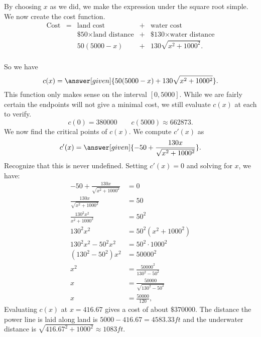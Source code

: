 \documentclass{ximera}
\begin{document}
\begin{example}
\begin{explanation}
\begin{image}
      \end{image}
      By choosing $x$ as we did, we make the expression under the
      square root simple. We now create the cost function.
    \[
    \begin{array}{ccccc}
      \text{Cost} &=&  \text{land cost} &+ & \text{water cost} \\
						&	& \text{\$50}\times \text{land distance} &+& \text{\$130}\times \text{water distance} \\
      &	& 50(5000-x) &+& 130\sqrt{x^2+1000^2}.\\
    \end{array}
    \]

    So we have
    \[
    c(x) = \answer[given]{50(5000-x)+ 130\sqrt{x^2+1000^2}}.
    \]
    This function only makes sense on the interval $[0,5000]$. While
    we are fairly certain the endpoints will not give a minimal cost,
    we still evaluate $c(x)$ at each to verify.
    \[
    c(0) = 380000 \quad\quad c(5000) \approx 662873.
    \]
    We now find the critical points of $c(x)$. We compute $c'(x)$ as
    \[
    c'(x) = \answer[given]{-50+\frac{130x}{\sqrt{x^2+1000^2}}}.
    \]
    Recognize that this is never undefined. Setting $c'(x)=0$ and solving
    for $x$, we have:
    \begin{align*}
      -50+\frac{130x}{\sqrt{x^2+1000^2}} &= 0 \\
      \frac{130x}{\sqrt{x^2+1000^2}}  &= 50\\
      \frac{130^2x^2}{x^2+1000^2} &= 50^2\\
      130^2x^2 &= 50^2(x^2+1000^2) \\
      130^2x^2-50^2x^2 &= 50^2\cdot1000^2\\
      (130^2-50^2)x^2 &= 50000^2\\
      x^2 &= \frac{50000^2}{130^2-50^2}\\
      x &= \frac{50000}{\sqrt{130^2-50^2}}\\
      x &= \frac{50000}{120},
    \end{align*}
    Evaluating $c(x)$ at $x=416.67$ gives a cost of about
    $\$370000$. The distance the power line is laid along land is
    $5000-416.67 = 4583.33\unit{ft}$ and the underwater distance is
    $\sqrt{416.67^2+1000^2} \approx 1083\unit{ft}$.
  \end{explanation}
\end{example}
\end{document}

